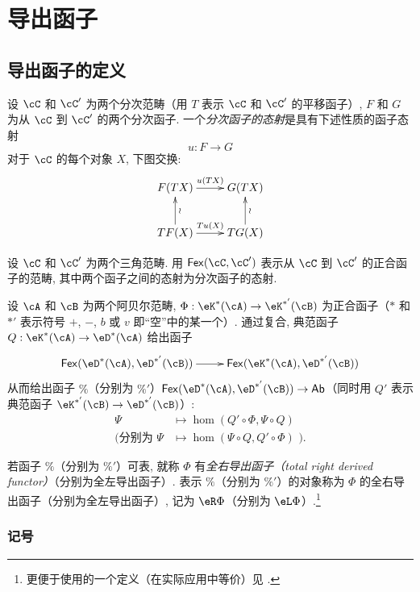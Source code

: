 \section{导出函子}\label{VIII:4}

\subsection{导出函子的定义}\label{VIII:4-1}

\begin{definition}\label{VIII:4-1-1}
设 $\cC$ 和 $\cC'$ 为两个分次范畴（用 $T$ 表示 $\cC$ 和 $\cC'$ 的平移函子）, $F$ 和 $G$ 为从 $\cC$ 到 $\cC'$ 的两个分次函子. 一个\emph{分次函子的态射}是具有下述性质的函子态射
\[
  u:F\to G
\]
对于 $\cC$ 的每个对象 $X$, 下图交换:
\[\xymatrix{
  F(T X) \ar[r]^-{u(T X)}
    & G(T X) \\
  T F(X) \ar[r]^-{T u(X)} \ar[u]_-\wr
    & T G(X) \ar[u]_-\wr
}\]
\end{definition}

设 $\cC$ 和 $\cC'$ 为两个三角范畴. 用 $\mathsf{Fex}(\cC,\cC')$ 表示从 $\cC$ 到 $\cC'$ 的正合函子的范畴, 其中两个函子之间的态射为分次函子的态射.

设 $\cA$ 和 $\cB$ 为两个阿贝尔范畴, $\Phi:\eK^\ast(\cA)\to \eK^{\ast'}(\cB)$ 为正合函子（$\ast$ 和 $\ast'$ 表示符号 $+$, $-$, $b$ 或 $v$ 即“空”中的某一个）. 通过复合, 典范函子 $Q:\eK^\ast(\cA)\to \eD^\ast(\cA)$ 给出函子
\[\xymatrix{
  \mathsf{Fex}(\eD^\ast(\cA),\eD^{\ast'}(\cB)) \ar[r]
    & \mathsf{Fex}(\eK^\ast(\cA),\eD^{\ast'}(\cB))
}\]
从而给出函子 $\%$（分别为 $\%'$）$\mathsf{Fex}(\eD^\ast(\cA),\eD^{\ast'}(\cB)) \to \mathsf{Ab}$（同时用 $Q'$ 表示典范函子 $\eK^{\ast'}(\cB) \to \eD^{\ast'}(\cB)$）:
\begin{align*}
  \Psi  &\mapsto \hom(Q'\circ \Phi,\Psi\circ Q) \\
  (\text{分别为 }\Psi &\mapsto \hom(\Psi\circ Q,Q'\circ \Phi)\text{ ).}
\end{align*}

\begin{definition}\label{VIII:4-1-2}
若函子 $\%$（分别为 $\%'$）可表, 就称 $\Phi$ 有\emph{全右导出函子（total right derived functor）}（分别为全左导出函子）. 表示 $\%$（分别为 $\%'$）的对象称为 $\Phi$ 的全右导出函子（分别为全左导出函子）, 记为 $\eR \Phi$（分别为 $\eL \Phi$）.\footnote{更便于使用的一个定义（在实际应用中等价）见 \cite[XVII 1.2]{sga4}.}
\end{definition}

\subsubsection{记号}\label{VIII:4-1-3}


